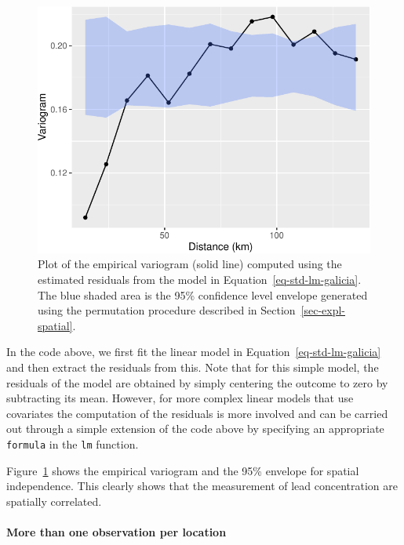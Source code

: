 \documentclass[
  letterpaper,
]{krantz}
\let\oldparagraph\paragraph
\renewcommand{\paragraph}[1]{\oldparagraph{#1}\mbox{}}
\begin{document}
\begin{figure}[H]

{\centering \includegraphics{03_model-fitting_files/figure-pdf/fig-galicia-variog-1.pdf}

}

\caption{\label{fig-galicia-variog}Plot of the empirical variogram
(solid line) computed using the estimated residuals from the model in
Equation~\ref{eq-std-lm-galicia}. The blue shaded area is the 95\%
confidence level envelope generated using the permutation procedure
described in Section~\ref{sec-expl-spatial}.}

\end{figure}

In the code above, we first fit the linear model in
Equation~\ref{eq-std-lm-galicia} and then extract the residuals from
this. Note that for this simple model, the residuals of the model are
obtained by simply centering the outcome to zero by subtracting its
mean. However, for more complex linear models that use covariates the
computation of the residuals is more involved and can be carried out
through a simple extension of the code above by specifying an
appropriate \texttt{formula} in the \texttt{lm} function.

Figure~\ref{fig-galicia-variog} shows the empirical variogram and the
95\% envelope for spatial independence. This clearly shows that the
measurement of lead concentration are spatially correlated.

\hypertarget{sec-explanal-lm}{%
\paragraph{More than one observation per
location}\label{sec-explanal-lm}}
\end{document}
